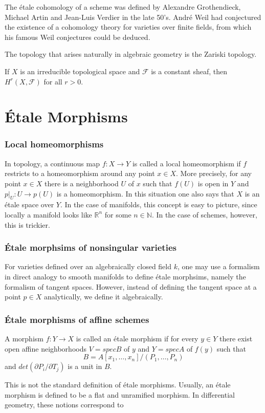 The \'etale cohomology of a scheme was defined by Alexandre Grothendieck, Michael Artin and Jean-Luis Verdier in the late 50's. Andr\'e Weil had conjectured the existence of a cohomology theory for varieties over finite fields, from which his famous Weil conjectures could be deduced.

The topology that arises naturally in algebraic geometry is the Zariski topology.

\begin{theorem}
  If $X$ is an irreducible topological space and $\mathcal{F}$ is a constant sheaf, then $H^r(X, \mathcal{F})$ for all $r>0$.
\end{theorem}


\section{\'Etale Morphisms}

\subsubsection{Local homeomorphisms}
In topology, a continuous map $f: X \to Y$ is called a local homeomorphism if $f$ restricts to a homeomorphism around any point $x \in X$. More precisely, for any point $x \in X$ there is a neighborhood $U$ of $x$ such that $f(U)$ is open in $Y$ and $p|_U: U \to p(U)$ is a homeomorphism. In this situation one also says that $X$ is an \'etale space over $Y$.
In the case of manifolds, this concept is easy to picture, since locally a manifold looks like $\mathbb{R}^n$ for some $n \in \mathbb{N}$. In the case of schemes, however, this is trickier.

\subsubsection{\'Etale morphsims of nonsingular varieties}
For varieties defined over an algebraically closed field $k$, one may use a formalism in direct analogy to smooth manifolds to define \'etale morphsims, namely the formalism of tangent spaces. However, instead of defining the tangent space at a point $p \in X$ analytically, we define it algebraically.

\subsubsection{\'Etale morphisms of affine schemes}
\begin{definition}
  A morphism $f: Y \to X$ is called an \'etale morphism if for every $y \in Y$ there exist open affine neighborhoods $V = spec B$ of $y$ and $Y = spec A$ of $f(y)$ such that 
  \[B = A[x_1, \dots, x_n]/(P_1, \dots, P_n)\]
  and $det(\partial P_i /\partial T_j)$ is a unit in $B$.
\end{definition}
This is not the standard definition of \'etale morphisms. Usually, an \'etale morphism is defined to be a flat and unramified morphism. In differential geometry, these notions correspond to






